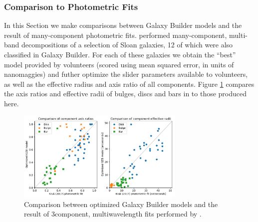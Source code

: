 \documentclass[../main.tex]{subfiles}
\begin{document}



\subsubsection{Comparison to Photometric Fits}
In this Section we make comparisons between Galaxy Builder models and the result of many-component photometric fits. \citet{Kruk2017:1710.00093v2} performed many-component, multi-band decompositions of a selection of Sloan galaxies, 12 of which were also classified in Galaxy Builder. For each of these galaxies we obtain the ``best'' model provided by volunteers (scored using mean squared error, in units of nanomaggies) and futher optimize the slider parameters available to volunteers, as well as the effective radius and axis ratio of all components. Figure \ref{fig:sd_comp_comparison} compares the axis ratios and effective radii of bulges, discs and bars in \citet{Kruk2017:1710.00093v2} to those produced here.

\begin{figure}
  \includegraphics[width=8cm]{images__results/sd_comp_comparison.pdf}
  \caption{Comparison between optimized Galaxy Builder models and the result of 3\-component, multi\-wavelength fits performed by \citet{Kruk2017:1710.00093v2}.}
  \label{fig:sd_comp_comparison}
\end{figure}
\end{document}
